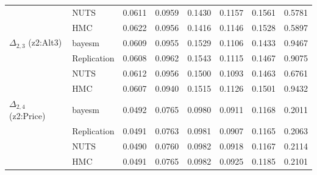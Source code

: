 \begin{tabular}{llcccccc}
 & NUTS & 0.0611 & 0.0959 & 0.1430 & 0.1157 & 0.1561 & 0.5781 \\
 & HMC & 0.0622 & 0.0956 & 0.1416 & 0.1146 & 0.1528 & 0.5897 \\
$\Delta_{2,3}$ (z2:Alt3) & bayesm & 0.0609 & 0.0955 & 0.1529 & 0.1106 & 0.1433 & 0.9467 \\
 & Replication & 0.0608 & 0.0962 & 0.1543 & 0.1115 & 0.1467 & 0.9075 \\
 & NUTS & 0.0612 & 0.0956 & 0.1500 & 0.1093 & 0.1463 & 0.6761 \\
 & HMC & 0.0607 & 0.0940 & 0.1515 & 0.1126 & 0.1501 & 0.9432 \\
$\Delta_{2,4}$ (z2:Price) & bayesm & 0.0492 & 0.0765 & 0.0980 & 0.0911 & 0.1168 & 0.2011 \\
 & Replication & 0.0491 & 0.0763 & 0.0981 & 0.0907 & 0.1165 & 0.2063 \\
 & NUTS & 0.0490 & 0.0760 & 0.0982 & 0.0918 & 0.1167 & 0.2114 \\
 & HMC & 0.0491 & 0.0765 & 0.0982 & 0.0925 & 0.1185 & 0.2101 \\
\bottomrule
\end{tabular}
